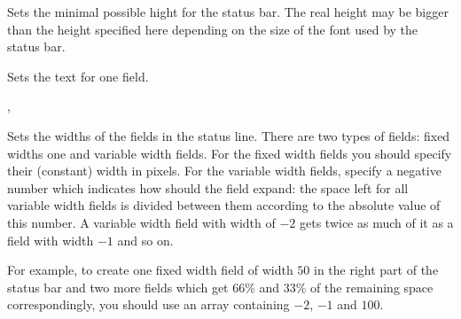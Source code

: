 


\label{wxstatusbarsetminheight}


Sets the minimal possible hight for the status bar. The real height may be
bigger than the height specified here depending on the size of the font used by
the status bar.

\label{wxstatusbarsetstatustext}


Sets the text for one field.





, 

\label{wxstatusbarsetstatuswidths}


Sets the widths of the fields in the status line. There are two types of
fields: fixed widths one and variable width fields. For the fixed width fields
you should specify their (constant) width in pixels. For the variable width
fields, specify a negative number which indicates how should the field expand:
the space left for all variable width fields is divided between them according
to the absolute value of this number. A variable width field with width of $-2$
gets twice as much of it as a field with width $-1$ and so on.

For example, to create one fixed width field of width $50$ in the right part of
the status bar and two more fields which get $66$\% and $33$\% of the remaining
space correspondingly, you should use an array containing $-2$, $-1$ and $100$.

